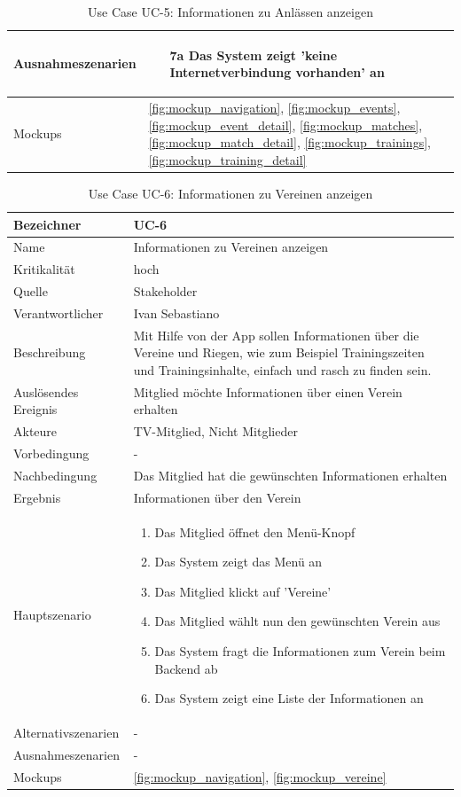 \begin{table}[ht]
\begin{tabular}{ l | p{10cm} }
	Ausnahmeszenarien&	\begin{enumerate}
					\item[7a] Das System zeigt 'keine Internetverbindung vorhanden' an
					\end{enumerate}
					\\ \hline
	Mockups	 	&	\ref{fig:mockup_navigation}, \ref{fig:mockup_events}, \ref{fig:mockup_event_detail},
					\ref{fig:mockup_matches}, \ref{fig:mockup_match_detail}, \ref{fig:mockup_trainings}, 
					\ref{fig:mockup_training_detail}
  \end{tabular}
   \caption{Use Case UC-5: Informationen zu Anlässen anzeigen}\label{table:use_case_5}
\end{table}


\begin{table}[ht]
\centering
  \begin{tabular}{ l | p{10cm} }
	\hline
	\rowcolor{gray}
	Bezeichner		&	UC-6\\ \hline
	Name			&	Informationen zu Vereinen anzeigen\\ \hline
	Kritikalität		&	hoch\\ \hline
	Quelle			&	Stakeholder\\ \hline
	Verantwortlicher	&	Ivan Sebastiano\\ \hline
	Beschreibung	&	Mit Hilfe von der App sollen Informationen über die Vereine und Riegen, wie zum Beispiel Trainingszeiten und Trainingsinhalte, einfach und rasch zu finden sein.\\ \hline
	Auslösendes Ereignis&	Mitglied möchte Informationen über einen Verein erhalten\\ \hline
	Akteure		&	TV-Mitglied, Nicht Mitglieder\\ \hline
	Vorbedingung	&	-\\ \hline
	Nachbedingung	&	Das Mitglied hat die gewünschten Informationen erhalten\\ \hline
	Ergebnis		&	Informationen über den Verein\\ \hline
	Hauptszenario	&	\begin{enumerate}
					\item Das Mitglied öffnet den Menü-Knopf
					\item Das System zeigt das Menü an
					\item Das Mitglied klickt auf 'Vereine'
					\item Das Mitglied wählt nun den gewünschten Verein aus
					\item Das System fragt die Informationen zum Verein beim Backend ab
					\item Das System zeigt eine Liste der Informationen an
					\end{enumerate}
					\\ \hline
	Alternativszenarien	&	-\\ \hline
	Ausnahmeszenarien&	-\\ \hline
	Mockups	 	&	\ref{fig:mockup_navigation}, \ref{fig:mockup_vereine}
  \end{tabular}
   \caption{Use Case UC-6: Informationen zu Vereinen anzeigen}\label{table:use_case_6}
\end{table}

